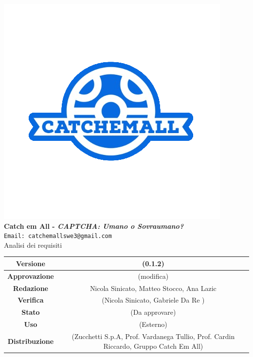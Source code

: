 \begin{titlepage}
\begin{center}
	\includegraphics[scale = 1.5]{img/logo.png}\\
	\bigskip
	\large \textbf{Catch em All - \textit{CAPTCHA: Umano o Sovraumano?}}\\
	\texttt{Email: catchemallswe3@gmail.com}\\
	\vfill
	{\fontsize{1.5cm}{0}\selectfont Analisi dei requisiti}\\
	\vfill
	\begin{tabularx}{\textwidth}{| c | c |}
		\hline
		\textbf{Versione} & (0.1.2)\\
		\hline
		\textbf{Approvazione} & (modifica)\\
		\hline
		\textbf{Redazione} & Nicola Sinicato, Matteo Stocco, Ana Lazic\\
		\hline
		\textbf{Verifica} & (Nicola Sinicato, Gabriele Da Re )\\
		\hline
		\textbf{Stato} & (Da approvare)\\
		\hline
		\textbf{Uso} & (Esterno)\\
		\hline
		\textbf{Distribuzione} & (Zucchetti S.p.A, Prof. Vardanega Tullio, Prof. Cardin Riccardo, Gruppo Catch Em All)\\
		\hline
	\end{tabularx}
\end{center}
\end{titlepage}